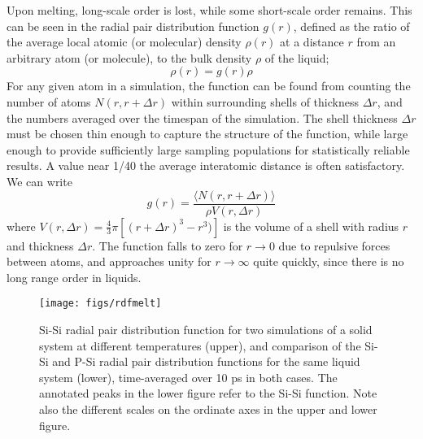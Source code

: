 \documentclass[11pt,bibliography=totoc,index=totoc]{scrbook}   %
\begin{document}
Upon melting, long-scale order is lost, while some short-scale order remains. 
This can be seen in the radial pair distribution function $g(r)$, defined as the ratio of the average local atomic (or molecular) density $\rho(r)$ at a distance $r$ from an arbitrary atom (or molecule), to the bulk density $\rho$ of the liquid;\cite{Kirkwood:1968}
\begin{equation}
  \rho(r) = g(r) \rho
\end{equation}
For any given atom in a simulation, the function can be found from counting the number of atoms $N(r,r+\Delta r)$ within surrounding shells of thickness $\Delta r$, and the numbers averaged over the timespan of the simulation. 
The shell thickness $\Delta r$ must be chosen thin enough to capture the structure of the function, 
while large enough to provide sufficiently large sampling populations for statistically reliable results. 
A value near 1/40 the average interatomic distance is often satisfactory.\cite[263]{Haile:1992} 
We can write
\begin{equation}
    g(r) = \frac{\langle N(r,r+\Delta r) \rangle}{\rho V(r,\Delta r)}
  \label{eq:gofr}
\end{equation}
where $V(r,\Delta r) = \frac{4}{3}\pi [(r+\Delta r)^3 - r^3)]$ is the volume of a shell with radius $r$ and thickness $\Delta r$.
The function falls to zero for $r\to 0$ due to repulsive forces between atoms, and approaches unity for $r\to\infty$ quite quickly, since there is no long range order in liquids.

% 
\begin{figure}[htbp]
  \centering
  \texttt{[image: figs/rdfmelt]}
  \caption{Si-Si radial pair distribution function for two simulations of a solid system at different temperatures (upper), and
  comparison of the Si-Si and P-Si radial pair distribution functions for the same liquid system (lower), 
  time-averaged over 10 ps in both cases. 
  The annotated peaks in the lower figure refer to the Si-Si function.
  Note also the different scales on the ordinate axes in the upper and lower figure.}
  \label{fig:pcf}
\end{figure}
\end{document}
